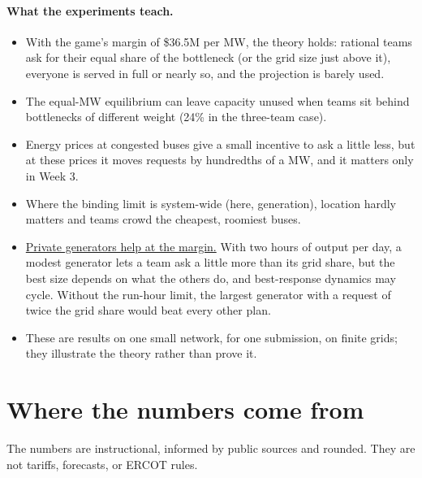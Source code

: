 \documentclass[10pt]{article}
\newcommand{\alert}[1]{{\color{alertblue}\uline{#1}}}
\begin{document}
\paragraph{What the experiments teach.}
\begin{itemize}[leftmargin=*]
  \item With the game's margin of \$36.5M per MW, the theory holds: rational
    teams ask for their equal share of the bottleneck (or the grid size just
    above it), everyone is served in full or nearly so, and the projection
    is barely used.
  \item The equal-MW equilibrium can leave capacity unused when teams sit
    behind bottlenecks of different weight (24\% in the three-team case).
  \item Energy prices at congested buses give a small incentive to ask a
    little less, but at these prices it moves requests by hundredths of a MW,
    and it matters only in Week 3.
  \item Where the binding limit is system-wide (here, generation), location
    hardly matters and teams crowd the cheapest, roomiest buses.
  \item \alert{Private generators help at the margin.} With two hours of
    output per day, a modest generator lets a team ask a little more than its
    grid share, but the best size depends on what the others do, and
    best-response dynamics may cycle. Without the run-hour limit, the largest
    generator with a request of twice the grid share would beat every other
    plan.
  \item These are results on one small network, for one submission, on finite
    grids; they illustrate the theory rather than prove it.
\end{itemize}


\fi

\section{Where the numbers come from}\label{app:numbers}

The numbers are instructional, informed by public sources and
rounded. They are not tariffs, forecasts, or ERCOT rules.
\end{document}
